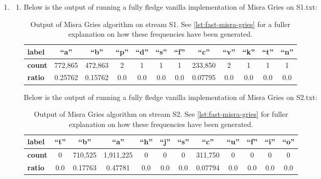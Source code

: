 \documentclass{article}
\begin{document}
\begin{enumerate}[leftmargin={*}, font={\bf}, label={\arabic*.}, ref={\arabic*}]
  \item \label{qst:1}
    \begin{enumerate}[label={(\Alph*)}, ref={\theenumi(\Alph*)}]
      \item \label{qst:1A}
        Below is the output of running a fully fledge vanilla implementation of
        {\sf Misra Gries} on {\sf S1.txt}:
        \begin{table}[H]
          \centering
          \begin{tabular}{|l|c|c|c|c|c|c|c|c|c|c|c|}
            \hline
            {\sf\bfseries label} & {\sf ``a''} & {\sf ``b''} & {\sf ``p''} & {\sf ``d''} & {\sf ``s''} & {\sf ``f''} & {\sf ``c''} & {\sf ``v''} & {\sf ``k''} & {\sf ``t''} & {\sf ``n''} \\ \hline
            {\sf\bfseries count} & 772,865 & 472,863 & 2 & 1 & 1 & 1 & 233,850 & 2 & 1 & 1 & 1 \\ \hline
            {\sf\bfseries ratio} & 0.25762 & 0.15762 & 0.0 & 0.0 & 0.0 & 0.0 & 0.07795 & 0.0 & 0.0 & 0.0 & 0.0 \\ \hline
          \end{tabular}
          \caption{
            Output of {\sf Misra Gries} algorithm on stream {\sf S1}. See
            \autoref{lst:fast-misra-gries} for a fuller \\ explanation on
            how these frequencies have been generated.
          }
          \label{tbl:misra-gries-table-s1}
        \end{table}

        Below is the output of running a fully fledge vanilla implementation of
        {\sf Misra Gries} on {\sf S2.txt}:
        \begin{table}[H]
          \centering
          \begin{tabular}{|l|c|c|c|c|c|c|c|c|c|c|c|}
            \hline
            {\sf\bfseries label} & {\sf ``t''} & {\sf ``b''} & {\sf ``a''} & {\sf ``h''} & {\sf ``j''} & {\sf ``s''} & {\sf ``c''} & {\sf ``u''} & {\sf ``f''} & {\sf ``i''} & {\sf ``o''} \\ \hline
            {\sf\bfseries count} & 0 & 710,525 & 1,911,225 & 0 & 0 & 0 & 311,750 & 0 & 0 & 0 & 0 \\ \hline
            {\sf\bfseries ratio} & 0.0 & 0.17763 & 0.47781 & 0.0 & 0.0 & 0.0 & 0.07794 & 0.0 & 0.0 & 0.0 & 0.0 \\ \hline
          \end{tabular}
          \caption{
            Output of {\sf Misra Gries} algorithm on stream {\sf S2}. See
            \autoref{lst:fast-misra-gries} for fuller \\ explanation on how
            these frequencies have been generated.
          }
          \label{tbl:misra-gries-table-s2}
        \end{table}


\end{enumerate}
\end{enumerate}
\end{document}
